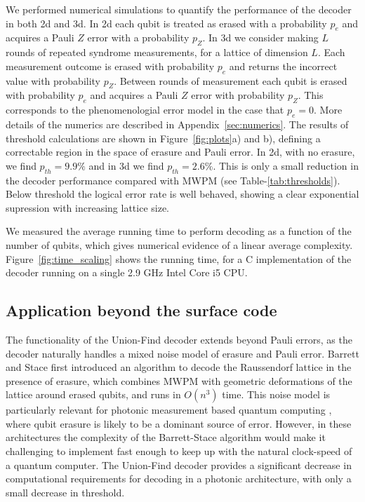 \documentclass[a4paper, 10pt, accepted=2021-11-03]{quantumarticle}
\begin{document}
{\medskip
We performed numerical simulations to quantify the performance of the decoder in both 2d and 3d. In 2d each qubit is treated as erased with a probability $p_e$ and acquires a Pauli $Z$ error with a probability $p_Z$. In 3d we consider making $L$ rounds of repeated syndrome measurements, for a lattice of dimension $L$. Each measurement outcome is erased with probability $p_e$ and returns the incorrect value with probability $p_Z$. Between rounds of measurement each qubit is erased with probability $p_e$ and acquires a Pauli $Z$ error with probability $p_Z$. This corresponds to the phenomenologial error model in the case that $p_e=0$. More details of the numerics are described in Appendix~\ref{sec:numerics}. The results of threshold calculations are shown in Figure~\ref{fig:plots}a) and b), defining a correctable region in the space of erasure and Pauli error. In 2d, with no erasure, we find $p_{th} = 9.9\%$ and in 3d we find $p_{th} = 2.6\%$. This is only a small reduction in the decoder performance compared with MWPM (see Table-\ref{tab:thresholds}). Below threshold the logical error rate is well behaved, showing a clear exponential supression with increasing lattice size.

\medskip
We measured the average running time to perform decoding as a function of the number of qubits, which gives numerical evidence of a linear average complexity. Figure~\ref{fig:time_scaling} shows the running time, for a C implementation of the decoder running on a single 2.9 GHz Intel Core i5 CPU. 


\subsection{Application beyond the surface code}

The functionality of the Union-Find decoder extends beyond Pauli errors, as the decoder naturally handles a mixed noise model of erasure and Pauli error. Barrett and Stace \cite{stace2010:loss_long, barrett2010:loss} first introduced an algorithm to decode the Raussendorf lattice \cite{raussenfort2007:cluster, raussenfort2006:ft, raussenfort2007:ft} in the presence of erasure, which combines MWPM with geometric deformations of the lattice around erased qubits, and runs in $O(n^3)$ time. This noise model is particularly relevant for photonic measurement based quantum computing 
 \cite{knill2001:LOQC, nielsen2004:LOCC_cluster, browne2005:LOCC_efficient, kieling2007:LOCC_percolation}, where qubit erasure is likely to be a dominant source of error. However, in these architectures the complexity of the Barrett-Stace algorithm would make it challenging to implement fast enough to keep up with the natural clock-speed of a quantum computer. The Union-Find decoder provides a significant decrease in computational requirements for decoding in a photonic architecture, with only a small decrease in threshold. 

}
\end{document}
